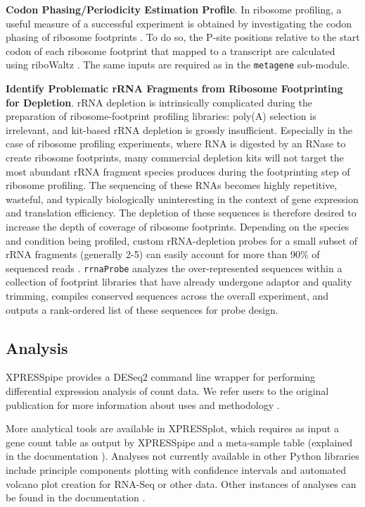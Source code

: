 \documentclass[10pt, oneside]{article}
\begin{document}
\noindent\textbf{Codon Phasing/Periodicity Estimation Profile}. In ribosome profiling, a useful measure of a successful experiment is obtained by investigating the codon phasing of ribosome footprints \cite{ingolia_meth}. To do so, the P-site positions relative to the start codon of each ribosome footprint that mapped to a transcript are calculated using riboWaltz \cite{ribowaltz}. The same inputs are required as in the \texttt{metagene} sub-module. \par

\noindent\textbf{Identify Problematic rRNA Fragments from Ribosome Footprinting for Depletion}. rRNA depletion is intrinsically complicated during the preparation of ribosome-footprint profiling libraries: poly(A) selection is irrelevant, and kit-based rRNA depletion is grossly insufficient. Especially in the case of ribosome profiling experiments, where RNA is digested by an RNase to create ribosome footprints, many commercial depletion kits will not target the most abundant rRNA fragment species produces during the footprinting step of ribosome profiling. The sequencing of these RNAs becomes highly repetitive, wasteful, and typically biologically uninteresting in the context of gene expression and translation efficiency. The depletion of these sequences is therefore desired to increase the depth of coverage of ribosome footprints. Depending on the species and condition being profiled, custom rRNA-depletion probes for a small subset of rRNA fragments (generally 2-5) can easily account for more than 90\% of sequenced reads \cite{ingolia_meth, ingolia_science}. \texttt{rrnaProbe} analyzes the over-represented sequences within a collection of footprint libraries that have already undergone adaptor and quality trimming, compiles conserved sequences across the overall experiment, and outputs a rank-ordered list of these sequences for probe design. \\

\subsection*{Analysis}
XPRESSpipe provides a DESeq2 command line wrapper for performing differential expression analysis of count data. We refer users to the original publication for more information about uses and methodology \cite{deseq2}. \par

More analytical tools are available in XPRESSplot, which requires as input a gene count table as output by XPRESSpipe and a meta-sample table (explained in the documentation \cite{xpressplot_docs}). Analyses not currently available in other Python libraries include principle components plotting with confidence intervals and automated volcano plot creation for RNA-Seq or other data. Other instances of analyses can be found in the documentation \cite{xpressplot_docs}. \\
\end{document}
